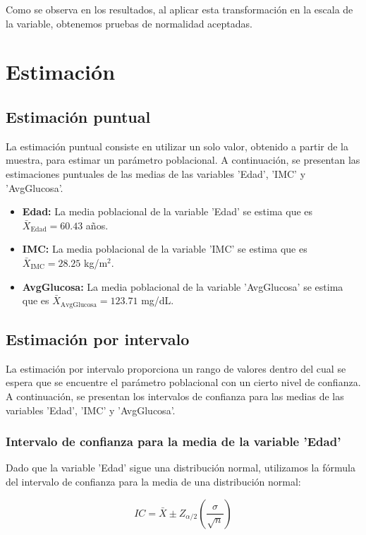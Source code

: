 \documentclass[a4paper, 12pt]{article}
\begin{document}
Como se observa en los resultados, al aplicar esta transformación en la escala de la variable, obtenemos pruebas de normalidad aceptadas.

\newpage

\section{Estimación}

\subsection{Estimación puntual}
La estimación puntual consiste en utilizar un solo valor, obtenido a partir de la muestra, para estimar un parámetro poblacional. A continuación, se presentan las estimaciones puntuales de las medias de las variables 'Edad', 'IMC' y 'AvgGlucosa'.

\begin{itemize}
    \item \textbf{Edad:} La media poblacional de la variable 'Edad' se estima que es $\bar{X}_{\text{Edad}} = 60.43$ años.
    \item \textbf{IMC:} La media poblacional de la variable 'IMC' se estima que es $\bar{X}_{\text{IMC}} = 28.25$ kg/m\(^2\).
    \item \textbf{AvgGlucosa:} La media poblacional de la variable 'AvgGlucosa' se estima que es $\bar{X}_{\text{AvgGlucosa}} = 123.71$ mg/dL.
\end{itemize}

\subsection{Estimación por intervalo}
La estimación por intervalo proporciona un rango de valores dentro del cual se espera que se encuentre el parámetro poblacional con un cierto nivel de confianza. A continuación, se presentan los intervalos de confianza para las medias de las variables 'Edad', 'IMC' y 'AvgGlucosa'.

\subsubsection{Intervalo de confianza para la media de la variable 'Edad'}
Dado que la variable 'Edad' sigue una distribución normal, utilizamos la fórmula del intervalo de confianza para la media de una distribución normal:

\[ IC = \bar{X} \pm Z_{\alpha/2} \left( \frac{\sigma}{\sqrt{n}} \right) \]
\end{document}

